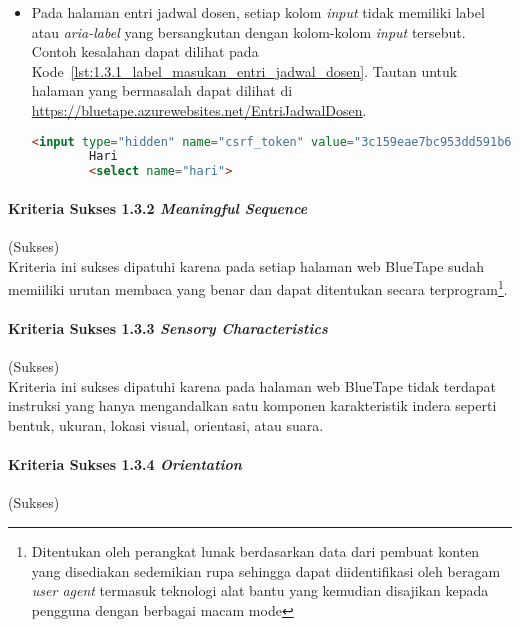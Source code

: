 \begin{itemize}
    \item Pada halaman entri jadwal dosen, setiap kolom \textit{input} tidak memiliki label atau \textit{aria-label} yang bersangkutan dengan kolom-kolom \textit{input} tersebut. Contoh kesalahan dapat dilihat pada \mbox{Kode \ref{lst:1.3.1_label_masukan_entri_jadwal_dosen}}. Tautan untuk halaman yang bermasalah dapat dilihat di \url{https://bluetape.azurewebsites.net/EntriJadwalDosen}.
    \begin{lstlisting}[frame=single, label={lst:1.3.1_label_masukan_entri_jadwal_dosen}, language=HTML, caption=Pelanggaran Kriteria Sukses 1.3.1 pada Halaman Entri Jadwal Dosen]
        <input type="hidden" name="csrf_token" value="3c159eae7bc953dd591b679c080ed066"/>
        Hari
        <select name="hari">
    \end{lstlisting}
\end{itemize} 

\paragraph{Kriteria Sukses 1.3.2 \textit{Meaningful Sequence}}
\label{par:kepatuhan_bluetape_kriteria_sukses_1.3.2}
(Sukses)\\

Kriteria ini sukses dipatuhi karena pada setiap halaman web BlueTape sudah memiiliki urutan membaca yang benar dan dapat ditentukan secara terprogram\footnote{Ditentukan oleh perangkat lunak berdasarkan data dari pembuat konten yang disediakan sedemikian rupa sehingga dapat diidentifikasi oleh beragam \textit{user agent} termasuk teknologi alat bantu yang kemudian disajikan kepada pengguna dengan berbagai macam mode}. 

\paragraph{Kriteria Sukses 1.3.3 \textit{Sensory Characteristics}}
\label{par:kepatuhan_bluetape_kriteria_sukses_1.3.3}
(Sukses)\\

Kriteria ini sukses dipatuhi karena pada halaman web BlueTape tidak terdapat instruksi yang hanya mengandalkan satu komponen karakteristik indera seperti bentuk, ukuran, lokasi visual, orientasi, atau suara.

\paragraph{Kriteria Sukses 1.3.4 \textit{Orientation}}
\label{par:kepatuhan_bluetape_kriteria_sukses_1.3.4}
(Sukses)\\

